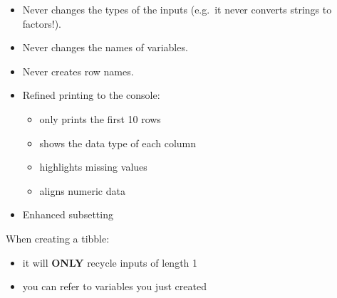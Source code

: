 \documentclass[]{book}
\newenvironment{Shaded}{\begin{snugshade}}{\end{snugshade}}
\newcommand{\CommentTok}[1]{\textcolor[rgb]{0.56,0.35,0.01}{\textit{#1}}}
\newcommand{\DataTypeTok}[1]{\textcolor[rgb]{0.13,0.29,0.53}{#1}}
\newcommand{\DecValTok}[1]{\textcolor[rgb]{0.00,0.00,0.81}{#1}}
\newcommand{\KeywordTok}[1]{\textcolor[rgb]{0.13,0.29,0.53}{\textbf{#1}}}
\newcommand{\NormalTok}[1]{#1}
\newcommand{\OperatorTok}[1]{\textcolor[rgb]{0.81,0.36,0.00}{\textbf{#1}}}
\newcommand{\StringTok}[1]{\textcolor[rgb]{0.31,0.60,0.02}{#1}}
\providecommand{\tightlist}{%
  \setlength{\itemsep}{0pt}\setlength{\parskip}{0pt}}
\theoremstyle{definition}
\theoremstyle{definition}
\theoremstyle{definition}
\theoremstyle{remark}
\begin{document}
\begin{itemize}
\tightlist
\item
  Never changes the types of the inputs (e.g.~it never converts strings
  to factors!).
\item
  Never changes the names of variables.
\item
  Never creates row names.
\item
  Refined printing to the console:

  \begin{itemize}
  \tightlist
  \item
    only prints the first 10 rows
  \item
    shows the data type of each column
  \item
    highlights missing values
  \item
    aligns numeric data
  \end{itemize}
\item
  Enhanced subsetting
\end{itemize}

When creating a tibble:

\begin{itemize}
\tightlist
\item
  it will \textbf{ONLY} recycle inputs of length 1
\item
  you can refer to variables you just created
\end{itemize}

\begin{Shaded}
\end{Shaded}
\end{document}
